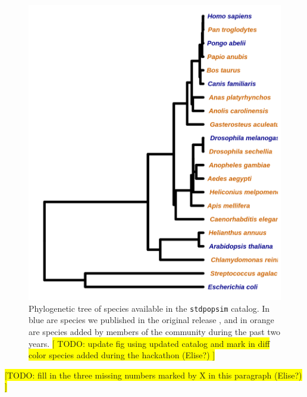 \documentclass[hidelinks]{article}
\begin{document}
\begin{figure}
	\includegraphics[width=\linewidth]{./figs/species_fig.png}
	\caption{Phylogenetic tree of species available in the \texttt{stdpopsim} catalog. 
		In blue are species we published in the original release \citep{Adrion2020}, and in orange are species added by members of the community during the past two years. 
		\colorbox{yellow}{[ TODO: update fig using updated catalog and mark in diff color species added during the hackathon (Elise?) ]}}
	\label{fig:tree}
\end{figure}


\colorbox{yellow}{[TODO: fill in the three missing numbers marked by X in this paragraph (Elise?) ]}
\end{document}
